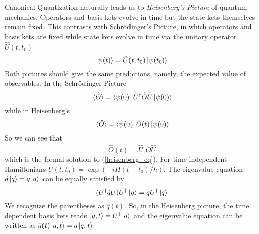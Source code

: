 Canonical Quantization naturally leads us to \textit{Heisenberg's Picture} of quantum mechanics. Operators and basis kets evolve in time but the state kets themselves remain fixed. This contrasts with Schrödinger's Picture, in which operators and basis kets are fixed while  state kets evolve in time via the unitary operator $\hat{U}(t,t_0)$
\begin{equation}
    \ket{\psi(t)}=\hat{U}(t,t_0)\ket{\psi(t_0)}
\end{equation}
Both pictures should give the same predictions, namely, the expected value of observables. In the Schrödinger Picture
\begin{equation}
    \expval*{\hat{O}}=\bra{\psi(0)}\hat{U}^\dagger\hat{O}\hat{U}\ket{\psi(0)}
\end{equation}
while in Heisenberg's
\begin{equation}
    \expval*{\hat{O}}=\bra{\psi(0)}\hat{O}(t)\ket{\psi(0)}
\end{equation}
So we can see that
\begin{equation}
    \hat{O}(t)=\hat{U}^\dagger\hat{O}\hat{U}
\end{equation}
which is the formal solution to (\ref{heisenberg_eq}). For time independent Hamiltonians $U(t,t_0)=\exp(-iH(t-t_0)/\hbar)$.
The eigenvalue equation $\hat{q}\ket{q}=q\ket{q}$ can be equally satisfied by
\begin{equation}
    (U^\dagger\hat{q}U)U^\dagger\ket{q}=qU^\dagger\ket{q}
\end{equation}
We recognize the parentheses as $\hat{q}(t)$. So, in the Heisenberg picture, the time dependent basis kets reads $\ket{q,t}=U^\dagger\ket{q}$ and the eigenvalue equation can be written as $\hat{q}(t)\ket{q,t}=q\ket{q,t}$\\

